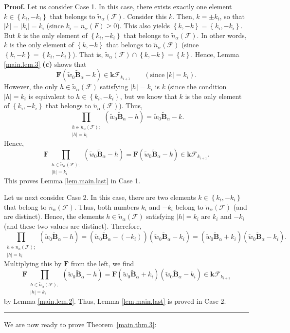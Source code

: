 \documentclass[12pt]{article}
\theoremstyle{definition}%
\theoremstyle{definition}%
\theoremstyle{remark}%
\newcommand{\tup}[1]{\left( #1 \right)}
\newcommand{\set}[1]{\left\{ #1 \right\}}
\newcommand{\abs}[1]{\left| #1 \right|} %
\newcommand{\kk}{\mathbf{k}}
\newcommand{\kf}{\kk\mathcal{F}}
\newcommand{\BBta}{\widetilde{\mathbf{B}}_{\alpha}}
\newcommand{\FF}{\mathbf{F}}
\newcommand{\CF}{\mathcal{F}}
\newcommand{\wotil}{\widetilde{w}_0}
\newcommand{\na}{n_{ \alpha } }%
\newcommand{\nna}{\widetilde{n}_{ \alpha } }%
\newenvironment{proof}[1][Proof]{\noindent\textbf{#1.} }{\ \rule{0.5em}{0.5em}}
\begin{document}
\begin{proof}
Let us consider Case 1. In this case,
there exists exactly one element
$k \in \set{k_i, -k_i}$ that belongs to $\nna\tup{\CF}$.
Consider this $k$. Then, $k = \pm k_i$, so that
$\abs{k} = \abs{k_i} = k_i$ (since
$k_i = \na\tup{F} \geq 0$). This also yields
$\set{k, -k} = \set{k_i, -k_i}$.
But $k$ is the only element
of $\set{k_i, -k_i}$ that belongs to $\nna\tup{\CF}$.
In other words, $k$ is the only element
of $\set{k, -k}$ that belongs to $\nna\tup{\CF}$
(since $\set{k, -k} = \set{k_i, -k_i}$).
That is, $\nna\tup{\CF} \cap \set{k,-k} = \set{k}$.
Hence,
Lemma \ref{main.lem.3} \textbf{(c)} shows that
\[
\FF\tup{\wotil\BBta - k} \in \kf_{k_{i+1}}
\qquad \left(\text{since $\abs{k} = k_i$}\right).
\]
However, the only $h \in \nna\tup{\CF}$ satisfying
$\abs{h} = k_i$ is $k$ (since the condition
$\abs{h} = k_i$ is equivalent to
$h \in \set{k_i, -k_i}$, but we know that
$k$ is the only element
of $\set{k_i, -k_i}$ that belongs to $\nna\tup{\CF}$).
Thus,
\[
\prod_{\substack{h \in \nna\tup{\CF};\\
\abs{h} = k_i}} \tup{ \wotil\BBta - h }
= \wotil\BBta - k.
\]
Hence,
\[
\FF \prod_{\substack{h \in \nna\tup{\CF};\\
\abs{h} = k_i}} \tup{ \wotil\BBta - h }
= \FF \tup{\wotil\BBta - k} \in \kf_{k_{i+1}}.
\]
This proves Lemma \ref{lem.main.last} in Case 1.

Let us next consider Case 2.
In this case, there are two elements $k\in
\set{k_i, -k_i}$ that belong to $\nna\tup{\CF}$.
Thus, both numbers $k_i$ and $-k_i$ belong to
$\nna\tup{\CF}$ (and are distinct).
Hence, the elements $h \in \nna\tup{\CF}$
satisfying $\abs{h} = k_i$ are $k_i$ and $-k_i$
(and these two values are distinct). Therefore,
\[
\prod_{\substack{h \in \nna\tup{\CF};
\\ \abs{h} = k_i}} \tup{ \wotil\BBta - h }
= \tup{ \wotil \BBta - \tup{-k_i} }\tup{ \wotil \BBta - k_i}
= \tup{ \wotil \BBta + k_i}\tup{ \wotil \BBta - k_i}.
\]
Multiplying this by $\FF$ from the left, we find
\[
\FF \prod_{\substack{h \in \nna\tup{\CF};
\\ \abs{h} = k_i}} \tup{ \wotil\BBta - h }
= \FF \tup{ \wotil \BBta + k_i}\tup{ \wotil \BBta - k_i}
\in \kf_{k_{i+1}}
\]
by Lemma \ref{main.lem.2}.
Thus, Lemma \ref{lem.main.last} is proved in Case 2.
\end{proof}

We are now ready to prove Theorem~\ref{main.thm.3}:
\end{document}
